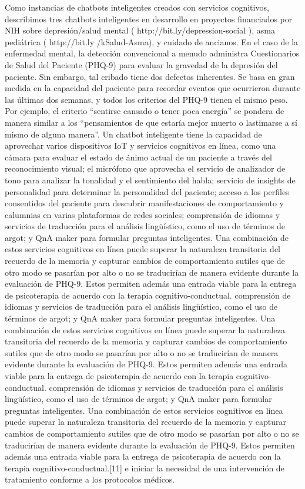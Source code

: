 Como instancias de chatbots inteligentes creados con servicios cognitivos, describimos tres chatbots inteligentes en desarrollo en proyectos financiados por NIH sobre depresión/salud mental ( http://bit.ly/depression-social ), asma pediátrica ( http://bit.ly /kSalud-Asma), y cuidado de ancianos. En el caso de la enfermedad mental, la detección convencional a menudo administra Cuestionarios de Salud del Paciente (PHQ-9) para evaluar la gravedad de la depresión del paciente. Sin embargo, tal cribado tiene dos defectos inherentes. Se basa en gran medida en la capacidad del paciente para recordar eventos que ocurrieron durante las últimas dos semanas, y todos los criterios del PHQ-9 tienen el mismo peso. Por ejemplo, el criterio “sentirse cansado o tener poca energía” se pondera de manera similar a los “pensamientos de que estaría mejor muerto o lastimarse a sí mismo de alguna manera”. Un chatbot inteligente tiene la capacidad de aprovechar varios dispositivos IoT y servicios cognitivos en línea, como una cámara para evaluar el estado de ánimo actual de un paciente a través del reconocimiento visual; el micrófono que aprovecha el servicio de analizador de tono para analizar la tonalidad y el sentimiento del habla; servicio de insights de personalidad para determinar la personalidad del paciente; acceso a los perfiles consentidos del paciente para descubrir manifestaciones de comportamiento y calumnias en varias plataformas de redes sociales; comprensión de idiomas y servicios de traducción para el análisis lingüístico, como el uso de términos de argot; y QnA maker para formular preguntas inteligentes. Una combinación de estos servicios cognitivos en línea puede superar la naturaleza transitoria del recuerdo de la memoria y capturar cambios de comportamiento sutiles que de otro modo se pasarían por alto o no se traducirían de manera evidente durante la evaluación de PHQ-9. Estos permiten además una entrada viable para la entrega de psicoterapia de acuerdo con la terapia cognitivo-conductual. comprensión de idiomas y servicios de traducción para el análisis lingüístico, como el uso de términos de argot; y QnA maker para formular preguntas inteligentes. Una combinación de estos servicios cognitivos en línea puede superar la naturaleza transitoria del recuerdo de la memoria y capturar cambios de comportamiento sutiles que de otro modo se pasarían por alto o no se traducirían de manera evidente durante la evaluación de PHQ-9. Estos permiten además una entrada viable para la entrega de psicoterapia de acuerdo con la terapia cognitivo-conductual. comprensión de idiomas y servicios de traducción para el análisis lingüístico, como el uso de términos de argot; y QnA maker para formular preguntas inteligentes. Una combinación de estos servicios cognitivos en línea puede superar la naturaleza transitoria del recuerdo de la memoria y capturar cambios de comportamiento sutiles que de otro modo se pasarían por alto o no se traducirían de manera evidente durante la evaluación de PHQ-9. Estos permiten además una entrada viable para la entrega de psicoterapia de acuerdo con la terapia cognitivo-conductual.[11] e iniciar la necesidad de una intervención de tratamiento conforme a los protocolos médicos.
